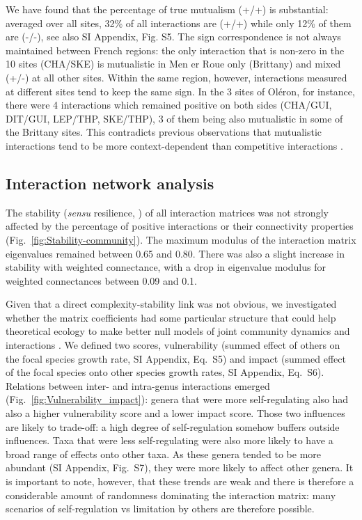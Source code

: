 \documentclass[9pt,twocolumn,twoside,lineno]{pnas-new}
\begin{document}
We have found that the percentage of true mutualism (+/+) is substantial:
averaged over all sites, 32\% of all interactions are (+/+) while
only 12\% of them are (-/-), see also SI Appendix, Fig. S5. The sign
correspondence is not always maintained between French regions: the
only interaction that is non-zero in the 10 sites (CHA/SKE) is mutualistic
in Men er Roue only (Brittany) and mixed (+/-) at all other sites.
Within the same region, however, interactions measured at different
sites tend to keep the same sign. In the 3 sites of Oléron, for instance,
there were 4 interactions which remained positive on both sides (CHA/GUI,
DIT/GUI, LEP/THP, SKE/THP), 3 of them being also mutualistic in some
of the Brittany sites. This contradicts previous observations that
mutualistic interactions tend to be more context-dependent than competitive
interactions \cite{chamberlain_how_2014}. 


\subsection*{Interaction network analysis}

The stability (\emph{sensu} resilience, )
of all interaction matrices was not strongly affected by the percentage
of positive interactions or their connectivity properties (Fig.~\ref{fig:Stability-community}).
The maximum modulus of the interaction matrix eigenvalues remained
between 0.65 and 0.80. There was also a slight increase in stability
with weighted connectance, with a drop in eigenvalue modulus for weighted
connectances between 0.09 and 0.1.

Given that a direct complexity-stability link was not obvious, we
investigated whether the matrix coefficients had some particular structure
that could help theoretical ecology to make better null models of
joint community dynamics and interactions \cite{james_constructing_2015}.
We defined two scores, vulnerability (summed effect of others on
the focal species growth rate, SI Appendix, Eq.~S5) and impact (summed
effect of the focal species onto other species growth rates, SI Appendix,
Eq.~S6). Relations between inter- and intra-genus interactions emerged
(Fig.~\ref{fig:Vulnerability_impact}): genera that were more self-regulating
also had also a higher vulnerability score and a lower impact score.
Those two influences are likely to trade-off: a high degree of self-regulation
somehow buffers outside influences. Taxa that were less self-regulating
were also more likely to have a broad range of effects onto other
taxa. As these genera tended to be more abundant (SI Appendix, Fig.~S7),
they were more likely to affect other genera. It is important to note,
however, that these trends are weak and there is therefore a considerable
amount of randomness dominating the interaction matrix: many scenarios
of self-regulation vs limitation by others are therefore possible.
\end{document}
